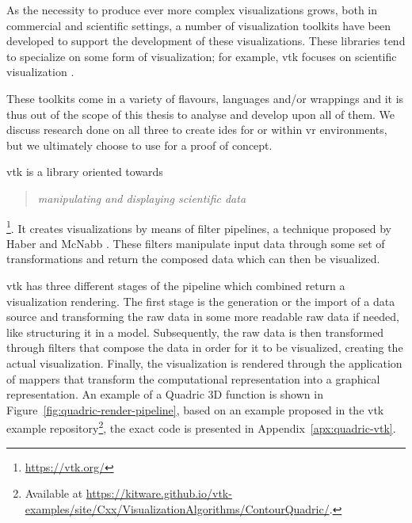As the necessity to produce ever more complex visualizations grows, both in commercial and scientific settings, a number of visualization toolkits have been developed to support the development of these visualizations. These libraries tend to specialize on some form of visualization; for example, \acrfull{vtk} focuses on scientific visualization \cite{kruis_creating_2017}.

These toolkits come in a variety of flavours, languages and/or wrappings and it is thus out of the scope of this thesis to analyse and develop upon all of them. We discuss research done on all three to create \acrshort{ide}s for or within \acrshort{vr} environments, but we ultimately choose to use for a proof of concept.

\acrfull{vtk} is a library oriented towards \blockquote{\textit{manipulating and displaying scientific data}}\footnote{\url{https://vtk.org/}}. It creates visualizations by means of filter pipelines, a technique proposed by Haber and McNabb \cite{haber1990visualization}. These filters manipulate input data through some set of transformations and return the composed data which can then be visualized. 

\acrshort{vtk} has three different stages of the pipeline which combined return a visualization rendering. The first stage is the generation or the import of a data source and transforming the raw data in some more readable raw data if needed, like structuring it in a model. Subsequently, the raw data is then transformed through filters that compose the data in order for it to be visualized, creating the actual visualization. Finally, the visualization is rendered through the application of mappers that transform the computational representation into a graphical representation. An example of a Quadric 3D function is shown in Figure~\ref{fig:quadric-render-pipeline}, based on an example proposed in the \acrshort{vtk} example repository\footnote{Available at \url{https://kitware.github.io/vtk-examples/site/Cxx/VisualizationAlgorithms/ContourQuadric/}.}, the exact code is presented in Appendix~\ref{apx:quadric-vtk}.

